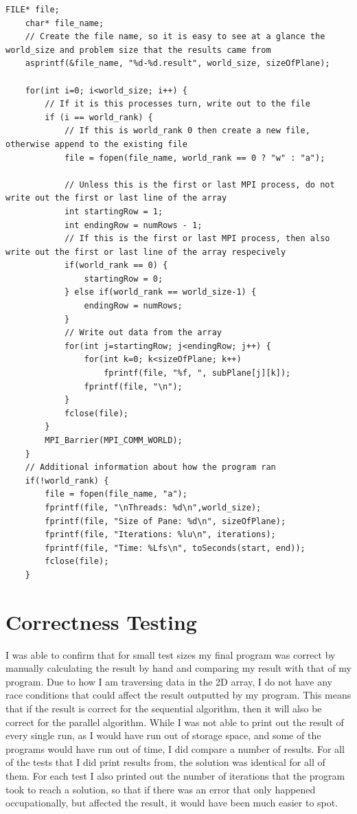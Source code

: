 \documentclass{report}
\begin{document}
\begin{lstlisting}[style=customc,caption=Write Results to File]
    FILE* file;
    char* file_name;
    // Create the file name, so it is easy to see at a glance the world_size and problem size that the results came from
    asprintf(&file_name, "%d-%d.result", world_size, sizeOfPlane);

    for(int i=0; i<world_size; i++) {
        // If it is this processes turn, write out to the file
        if (i == world_rank) {
            // If this is world_rank 0 then create a new file, otherwise append to the existing file
            file = fopen(file_name, world_rank == 0 ? "w" : "a");
            
            // Unless this is the first or last MPI process, do not write out the first or last line of the array
            int startingRow = 1;
            int endingRow = numRows - 1;
            // If this is the first or last MPI process, then also write out the first or last line of the array respecively
            if(world_rank == 0) {
                startingRow = 0;
            } else if(world_rank == world_size-1) {
                endingRow = numRows;
            }
            // Write out data from the array
            for(int j=startingRow; j<endingRow; j++) {
                for(int k=0; k<sizeOfPlane; k++)
                    fprintf(file, "%f, ", subPlane[j][k]);
                fprintf(file, "\n");
            }
            fclose(file);
        }
        MPI_Barrier(MPI_COMM_WORLD);
    }
    // Additional information about how the program ran
    if(!world_rank) {
        file = fopen(file_name, "a");
        fprintf(file, "\nThreads: %d\n",world_size);
        fprintf(file, "Size of Pane: %d\n", sizeOfPlane);
        fprintf(file, "Iterations: %lu\n", iterations);
        fprintf(file, "Time: %Lfs\n", toSeconds(start, end));
        fclose(file);
    }
\end{lstlisting}

\chapter{Correctness Testing}
I was able to confirm that for small test sizes my final program was correct by manually calculating the result by hand and comparing my result with that of my program. Due to how I am traversing data in the 2D array, I do not have any race conditions that could affect the result outputted by my program. This means that if the result is correct for the sequential algorithm, then it will also be correct for the parallel algorithm.
While I was not able to print out the result of every single run, as I would have run out of storage space, and some of the programs would have run out of time, I did compare a number of results. For all of the tests that I did print results from, the solution was identical for all of them. For each test I also printed out the number of iterations that the program took to reach a solution, so that if there was an error that only happened occupationally, but affected the result, it would have been much easier to spot.
\end{document}

